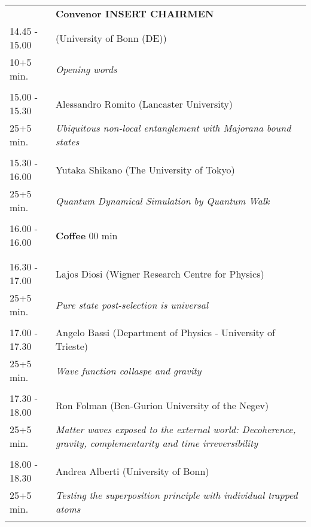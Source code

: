 \begin{longtable}{p{3cm}p{13cm}}
&\hfill {\bf Convenor INSERT CHAIRMEN }\\ 
14.45 - 15.00 &  (University of Bonn (DE))\\ 
10+5 min. & {\it Opening words}\\ 
 & \\ 
15.00 - 15.30 & Alessandro Romito (Lancaster University)\\ 
25+5 min. & {\it Ubiquitous non-local entanglement with Majorana bound states}\\ 
 & \\ 
15.30 - 16.00 & Yutaka Shikano (The University of Tokyo)\\ 
25+5 min. & {\it Quantum Dynamical Simulation by Quantum Walk}\\ 
 & \\ 
16.00 - 16.00 & {\bf Coffee} \hfill 00 min \\ 
 & \\ 
 & \\ 
16.30 - 17.00 & Lajos Diosi (Wigner Research Centre for Physics)\\ 
25+5 min. & {\it Pure state post-selection is universal}\\ 
 & \\ 
17.00 - 17.30 & Angelo Bassi (Department of Physics - University of Trieste)\\ 
25+5 min. & {\it Wave function collaspe and gravity}\\ 
 & \\ 
17.30 - 18.00 & Ron Folman (Ben-Gurion University of the Negev)\\ 
25+5 min. & {\it Matter waves exposed to the external world: Decoherence, gravity, complementarity and time irreversibility}\\ 
 & \\ 
18.00 - 18.30 & Andrea Alberti (University of Bonn)\\ 
25+5 min. & {\it Testing the superposition principle with individual trapped atoms}\\ 
 & \\ 
\end{longtable}

